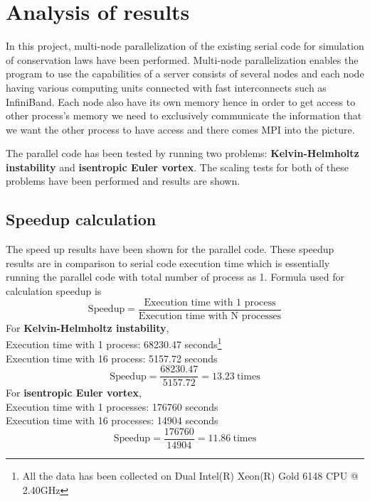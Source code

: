 \section{Analysis of results}
In this project, multi-node parallelization of the existing serial code for simulation of conservation laws have been performed. Multi-node parallelization enables the program to use the capabilities of a server consists of several nodes and each node having various computing units connected with fast interconnects such as {\ttfamily InfiniBand}. Each node also have its own memory hence in order to get access to other process's memory we need to exclusively communicate the information that we want the other process to have access and there comes {\ttfamily MPI} into the picture.

The parallel code has been tested by running two problems: \textbf{Kelvin-Helmholtz instability} and \textbf{isentropic Euler vortex}. The scaling tests for both of these problems have been performed and results are shown.
\subsection{Speedup calculation}
The speed up results have been shown for the parallel code. These speedup results are in comparison to serial code execution time which is essentially running the parallel code with total number of process as 1. Formula used for calculation speedup is
\begin{equation*}
    \text{Speedup} = \frac{\text{Execution time with 1 process}}{\text{Execution time with N processes}}
\end{equation*}
For \textbf{Kelvin-Helmholtz instability}, \\
Execution time with 1 process: 68230.47 seconds\footnote[3]{All the data has been collected on Dual Intel(R) Xeon(R) Gold 6148 CPU @ 2.40GHz}\\
Execution time with 16 process: 5157.72 seconds
\begin{equation*}
    \text{Speedup} = \frac{68230.47}{5157.72} = 13.23~\text{times}
\end{equation*}
\linebreak
For \textbf{isentropic Euler vortex},\\
Execution time with 1 processes: 176760 seconds\footnotemark[3] \\
Execution time with 16 processes: 14904 seconds
\begin{equation*}
    \text{Speedup} = \frac{176760}{14904} = 11.86~\text{times}
\end{equation*}
\vspace{10pt}

